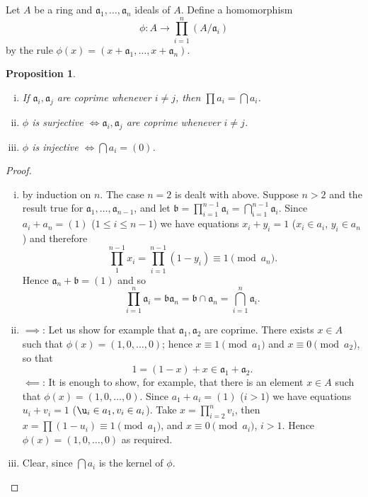 \documentclass[class=book, crop=false]{standalone}
\newtheorem{proposition}[theorem]{Proposition}
\theoremstyle{definition}
\theoremstyle{remark}
\begin{document}
Let $A$ be a ring and $\mathfrak{a}_{1}, \ldots, \mathfrak{a}_{n}$ ideals of
$A$. Define a homomorphism
\[
  \phi: A \to \prod_{i=1}^{n}\left(A / \mathfrak{a}_{i}\right)
\]
by the rule
$\phi(x)=\left(x+\mathfrak{a}_{1}, \ldots, x+\mathfrak{a}_{n}\right)$.
\begin{proposition}\label{prop:1.10}
  \begin{enumerate}[i)]
    \item If $\mathfrak{a}_{i}, \mathfrak{a}_{j}$ are coprime whenever
          $i \neq j$, then $\prod a_{i}=\bigcap a_{i}$.
    \item $\phi$ is surjective $\iff \mathfrak{a}_{i}, \mathfrak{a}_{j}$ are
          coprime whenever $i \neq j$.
    \item $\phi$ is injective $\iff\bigcap a_{i}=(0)$.
  \end{enumerate}
\end{proposition}
\begin{proof}
  \begin{enumerate}[i)]
    \item by induction on $n$. The case $n=2$ is dealt with above. Suppose $n>2$
          and the result true for
          $\mathfrak{a}_{1}, \ldots, \mathfrak{a}_{n-1}$, and let
          $\mathfrak{b}=\prod_{i=1}^{n-1} \mathfrak{a}_{i}=\bigcap_{\mathfrak{i}=1}^{n-1} \mathfrak{a}_{i}$.
          Since $a_{i}+a_{n}=(1)$ ($1 \le i \le n-1$) we have equations
          $x_{i}+y_{i}=1$ ($x_{i} \in a_{i}$, $y_{i} \in a_{n}$) and therefore
          \[
          \prod_{1}^{n-1} x_{i}=\prod_{i=1}^{n-1}(1-y_{i}) \equiv 1\pmod {a_{n}}.
          \]
          Hence $\mathfrak{a}_{n}+\mathfrak{b}=(1)$ and so
          \[
          \prod_{i=1}^{n} \mathfrak{a}_{i}=\mathfrak{b} \mathfrak{a}_{n}=\mathfrak{b} \cap \mathfrak{a}_{n}=\bigcap_{i=1}^{n} \mathfrak{a}_{i}.
          \]
    \item $\implies$: Let us show for example that
          $\mathfrak{a}_{1}, \mathfrak{a}_{2}$ are coprime. There exists
          $x \in A$ such that $\phi(x)=(1,0, \ldots, 0)$; hence
          $x \equiv 1\pmod {a_{1}}$ and $x \equiv 0\pmod {a_{2}}$, so that
          \[
          1=(1-x)+x \in \mathfrak{a}_{1}+\mathfrak{a}_{2} .
          \]
          $\impliedby$: It is enough to show, for example, that there is an
          element $x \in A$ such that $\phi(x)=(1,0, \ldots, 0)$. Since
          $a_{1}+a_{i}=(1)$ ($i>1$) we have equations $u_{i}+v_{i}=1$
          ($\u_{i} \in a_{1}, v_{i} \in a_{i}$). Take $x=\prod_{i=2}^{n} v_{i}$,
          then $x=\prod\left(1-u_{i}\right) \equiv 1\pmod{a_{1}}$, and
          $x \equiv 0\pmod{a_{i}}$, $i>1$. Hence $\phi(x)=(1,0, \ldots, 0)$ as
          required.
    \item Clear, since $\bigcap a_{i}$ is the kernel of $\phi$.
  \end{enumerate}
\end{proof}
\end{document}
